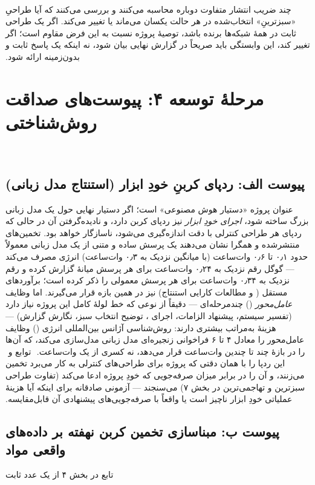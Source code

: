 ‫\documentclass[a4paper,12pt]{article}
\begin{document}
‫چند ضریب انتشار متفاوت دوباره محاسبه می‌کنند و بررسی می‌کنند که آیا
‫طراحیِ «سبزترینِ» انتخاب‌شده در هر حالت یکسان می‌ماند یا تغییر
‫می‌کند. اگر یک طراحی ثابت در همهٔ شبکه‌ها برنده باشد، توصیهٔ پروژه
‫نسبت به این فرض مقاوم است؛ اگر تغییر کند، این وابستگی باید صریحاً در
‫گزارش نهایی بیان شود، نه اینکه یک پاسخ ثابت و بدون‌زمینه ارائه شود.
‫
‫\section{مرحلهٔ توسعه ۴: پیوست‌های صداقت روش‌شناختی}
‫
‫\subsection{پیوست الف: ردپای کربنِ خودِ ابزار (استنتاج مدل زبانی)}
‫عنوان پروژه «دستیار هوش مصنوعی» است؛ اگر دستیار نهایی حول یک مدل
‫زبانی بزرگ ساخته شود، \emph{اجرای خودِ ابزار} نیز ردپای کربن دارد،
‫و نادیده‌گرفتن آن در حالی که ردپای هر طراحی کنترلی با دقت اندازه‌گیری
‫می‌شود، ناسازگار خواهد بود. تخمین‌های منتشرشده و همگرا نشان می‌دهند
‫یک پرسش ساده و متنی از یک مدل زبانی معمولاً حدود ۰٫۱ تا
‫۰٫۶ وات‌ساعت (با میانگین نزدیک به ۰٫۳ وات‌ساعت) انرژی
‫مصرف می‌کند — گوگل رقم نزدیک به ۰٫۲۴ وات‌ساعت برای هر پرسش
‫میانهٔ  گزارش کرده و  رقم نزدیک به
‫۰٫۳۴ وات‌ساعت برای هر پرسش معمولی  را ذکر کرده
‫است؛ برآوردهای مستقل ( و مطالعات کارایی استنتاج) نیز
‫در همین بازه قرار می‌گیرند. اما وظایف \emph{عامل‌محور}
‫() چندمرحله‌ای — دقیقاً از نوعی که خط لولهٔ کامل این
‫پروژه نیاز دارد (تفسیر سیستم، پیشنهاد الزامات، اجرای
‫، توضیح انتخاب سبز، نگارش گزارش) — هزینهٔ به‌مراتب
‫بیشتری دارند: روش‌شناسی آژانس بین‌المللی انرژی () وظایف
‫عامل‌محور را معادل ۴ تا ۶ فراخوانی زنجیره‌ای مدل زبانی مدل‌سازی
‫می‌کند، که آن‌ها را در بازهٔ چند تا چندین وات‌ساعت قرار می‌دهد، نه
‫کسری از یک وات‌ساعت.
‫
‫توابع \texttt{} و
‫\texttt{} این ردپا را با همان
‫دقتی که پروژه برای طراحی‌های کنترلی به کار می‌برد تخمین می‌زنند، و
‫آن را در برابر میزان صرفه‌جویی  که خودِ پروژه ادعا می‌کند
‫(تفاوت طراحی سبزترین و تهاجمی‌ترین در بخش ۷) می‌سنجند — آزمونی
‫صادقانه برای اینکه آیا هزینهٔ عملیاتی خودِ ابزار ناچیز است یا واقعاً
‫با صرفه‌جویی‌های پیشنهادی آن قابل‌مقایسه.
‫
‫\subsection{پیوست ب: مبناسازی تخمین کربن نهفته بر داده‌های واقعی مواد}
‫تابع \texttt{} در بخش ۴ از یک عدد ثابت
\end{document}
